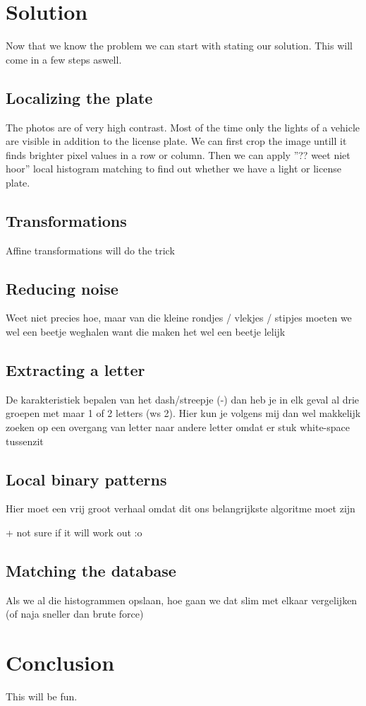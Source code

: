 \documentclass[a4paper]{article}
\begin{document}
\section{Solution}

Now that we know the problem we can start with stating our solution. This will
come in a few steps aswell.

\subsection{Localizing the plate}

The photos are of very high contrast. Most of the time only the lights of a vehicle
are visible in addition to the license plate. We can first crop the image untill
it finds brighter pixel values in a row or column. Then we can apply ''?? weet niet hoor'' local histogram
matching to find out whether we have a light or license plate.

\subsection{Transformations}

Affine transformations will do the trick

\subsection{Reducing noise}

Weet niet precies hoe, maar van die kleine rondjes / vlekjes / stipjes moeten
we wel een beetje weghalen want die maken het wel een beetje lelijk

\subsection{Extracting a letter}

De karakteristiek bepalen van het dash/streepje (-) dan heb je in elk geval al
drie groepen met maar 1 of 2 letters (ws 2). Hier kun je volgens mij dan wel 
makkelijk zoeken op een overgang van letter naar andere letter omdat er stuk
white-space tussenzit

\subsection{Local binary patterns}

Hier moet een vrij groot verhaal omdat dit ons belangrijkste algoritme moet zijn

+ not sure if it will work out :o

\subsection{Matching the database}

Als we al die histogrammen opslaan, hoe gaan we dat slim met elkaar vergelijken
(of naja sneller dan brute force)


\section{Conclusion}

This will be fun.
\end{document}
